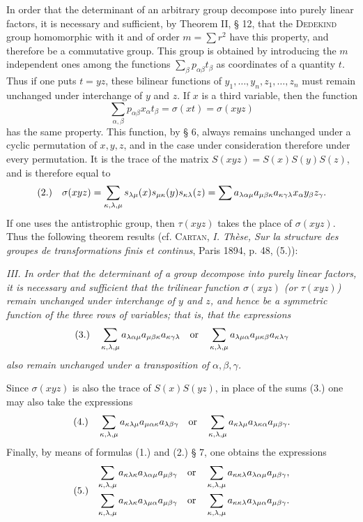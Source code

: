 \documentclass[11pt]{article}
\newcommand{\fnum}[1]{\textup{(\ensuremath{#1}.)}\quad}
\begin{document}
In order that the determinant of an arbitrary group decompose into purely linear factors, it is necessary and sufficient, by Theorem II, § 12, that the \textsc{Dedekind} group homomorphic with it and of order $m=\sum r^2$ have this property, and therefore be a commutative group. This group is obtained by introducing the $m$ independent ones among the functions $\sum_\beta p_{\alpha\beta}t_\beta$ as coordinates of a quantity $t$. Thus if one puts $t=yz$, these bilinear functions of $y_1,\ldots,y_n,z_1,\ldots,z_n$ must remain unchanged under interchange of $y$ and $z$. If $x$ is a third variable, then the function
\[
 \sum_{\alpha,\beta}p_{\alpha\beta}x_\alpha t_\beta=\sigma(xt)=\sigma(xyz)
\]
has the same property. This function, by § 6, always remains unchanged under a cyclic permutation of $x,y,z$, and in the case under consideration therefore under every permutation. It is the trace of the matrix $S(xyz)=S(x)S(y)S(z)$, and is therefore equal to
\[
\fnum{2} \sigma(xyz)=\sum_{\kappa,\lambda,\mu}s_{\lambda\mu}(x)s_{\mu\kappa}(y)s_{\kappa\lambda}(z)
=\sum a_{\lambda\alpha\mu}a_{\mu\beta\kappa}a_{\kappa\gamma\lambda}x_\alpha y_\beta z_\gamma.
\]
If one uses the antistrophic group, then $\tau(xyz)$ takes the place of $\sigma(xyz)$. Thus the following theorem results (cf. \textsc{Cartan}, \emph{I. Thèse, Sur la structure des groupes de transformations finis et continus}, Paris 1894, p. 48, (5.)):

\emph{III. In order that the determinant of a group decompose into purely linear factors, it is necessary and sufficient that the trilinear function $\sigma(xyz)$ (or $\tau(xyz)$) remain unchanged under interchange of $y$ and $z$, and hence be a symmetric function of the three rows of variables; that is, that the expressions}
\[
\fnum{3} \sum_{\kappa,\lambda,\mu}a_{\lambda\alpha\mu}a_{\mu\beta\kappa}a_{\kappa\gamma\lambda}
\quad\text{or}\quad
\sum_{\kappa,\lambda,\mu}a_{\lambda\mu\alpha}a_{\mu\kappa\beta}a_{\kappa\lambda\gamma}
\]
\emph{also remain unchanged under a transposition of $\alpha,\beta,\gamma$.}

Since $\sigma(xyz)$ is also the trace of $S(x)S(yz)$, in place of the sums (3.) one may also take the expressions
\[
\fnum{4} \sum_{\kappa,\lambda,\mu}a_{\kappa\lambda\mu}a_{\mu\alpha\kappa}a_{\lambda\beta\gamma}
\quad\text{or}\quad
\sum_{\kappa,\lambda,\mu}a_{\kappa\lambda\mu}a_{\lambda\kappa\alpha}a_{\mu\beta\gamma}.
\]
Finally, by means of formulas (1.) and (2.) § 7, one obtains the expressions
\[
\fnum{5}\begin{gathered}
 \sum_{\kappa,\lambda,\mu}a_{\kappa\lambda\kappa}a_{\lambda\alpha\mu}a_{\mu\beta\gamma}
 \quad\text{or}\quad
 \sum_{\kappa,\lambda,\mu}a_{\kappa\kappa\lambda}a_{\lambda\alpha\mu}a_{\mu\beta\gamma},\\
 \sum_{\kappa,\lambda,\mu}a_{\kappa\lambda\kappa}a_{\lambda\mu\alpha}a_{\mu\beta\gamma}
 \quad\text{or}\quad
 \sum_{\kappa,\lambda,\mu}a_{\kappa\kappa\lambda}a_{\lambda\mu\alpha}a_{\mu\beta\gamma}.
\end{gathered}
\]
\end{document}
